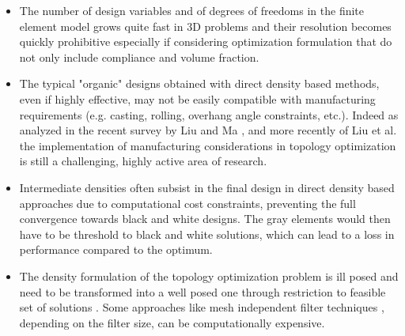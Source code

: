      \begin{itemize} 
   \item The number of design variables and of degrees of freedoms in the finite element model grows quite fast in 3D problems and their resolution becomes quickly prohibitive especially if considering optimization formulation that do not only include compliance and volume fraction. \item The typical "organic" designs obtained with direct density based methods, even if highly effective, may not be easily compatible with manufacturing requirements (e.g. casting, rolling, overhang angle constraints, etc.). Indeed as analyzed in the recent survey by Liu and Ma \cite{liu2016survey}, and more recently of Liu et al. \cite{liu_current_2018} the implementation of manufacturing considerations in topology optimization is still a challenging, highly active area of research.  
   \item Intermediate densities often subsist in the final design in direct density based approaches due to computational cost constraints, preventing the full convergence towards black and white designs. The gray elements would then have to be threshold to black and white solutions, which can lead to a loss in performance compared to the optimum.  
   \item The density formulation of the topology optimization problem is ill posed and need to be transformed into a well posed one through restriction to feasible set of solutions \cite{borrvall2001topology}. Some approaches like mesh independent filter techniques \cite{sigmund1994design}, depending on the filter size, can be computationally expensive.
   \end{itemize}

